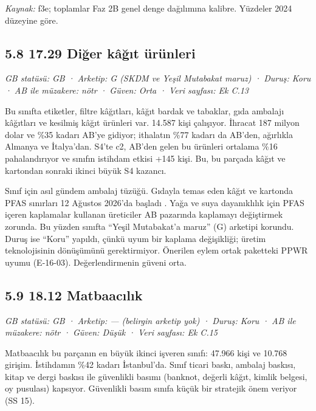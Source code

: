 \endgroup

\emph{Kaynak:} \etiketT{} f3e; toplamlar Faz 2B genel denge dağılımına kalibre. Yüzdeler 2024 düzeyine göre.

\hypertarget{nace_kartlar_16-18-58-1729-diux11fer-kuxe2ux11fux131t-uxfcruxfcnleri}{%
\subsection{5.8 17.29 Diğer kâğıt ürünleri}\label{nace_kartlar_16-18-58-1729-diux11fer-kuxe2ux11fux131t-uxfcruxfcnleri}}

\emph{GB statüsü: GB · Arketip: G (SKDM ve Yeşil Mutabakat maruz) · Duruş: Koru · AB ile müzakere: nötr · Güven: Orta · Veri sayfası: Ek C.13}

Bu sınıfta etiketler, filtre kâğıtları, kâğıt bardak ve tabaklar, gıda ambalajı kâğıtları ve kesilmiş kâğıt ürünleri var. 14.587 kişi çalışıyor. İhracat 187 milyon dolar ve \%35 kadarı AB'ye gidiyor; ithalatın \%77 kadarı da AB'den, ağırlıkla Almanya ve İtalya'dan. S4'te c2, AB'den gelen bu ürünleri ortalama \%16 pahalandırıyor ve sınıfın istihdam etkisi +145 kişi. Bu, bu parçada kâğıt ve kartondan sonraki ikinci büyük S4 kazancı.

Sınıf için asıl gündem ambalaj tüzüğü. Gıdayla temas eden kâğıt ve kartonda PFAS sınırları 12 Ağustos 2026'da başladı \etiketV{}. Yağa ve suya dayanıklılık için PFAS içeren kaplamalar kullanan üreticiler AB pazarında kaplamayı değiştirmek zorunda. Bu yüzden sınıfta ``Yeşil Mutabakat'a maruz'' (G) arketipi korundu. Duruş ise ``Koru'' yapıldı, çünkü uyum bir kaplama değişikliği; üretim teknolojisinin dönüşümünü gerektirmiyor. Önerilen eylem ortak paketteki PPWR uyumu (E-16-03). Değerlendirmenin güveni orta.

\hypertarget{nace_kartlar_16-18-59-1812-matbaacux131lux131k}{%
\subsection{5.9 18.12 Matbaacılık}\label{nace_kartlar_16-18-59-1812-matbaacux131lux131k}}

\emph{GB statüsü: GB · Arketip: --- (belirgin arketip yok) · Duruş: Koru · AB ile müzakere: nötr · Güven: Düşük · Veri sayfası: Ek C.15}

Matbaacılık bu parçanın en büyük ikinci işveren sınıfı: 47.966 kişi ve 10.768 girişim. İstihdamın \%42 kadarı İstanbul'da. Sınıf ticari baskı, ambalaj baskısı, kitap ve dergi baskısı ile güvenlikli basımı (banknot, değerli kâğıt, kimlik belgesi, oy pusulası) kapsıyor. Güvenlikli basım sınıfa küçük bir stratejik önem veriyor (SS 15).

